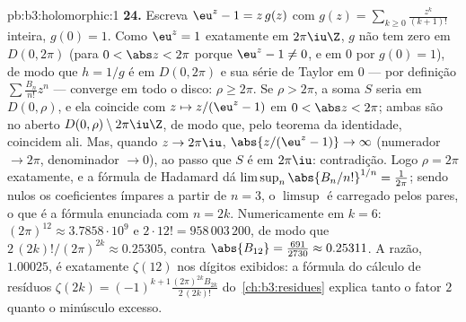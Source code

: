 \begin{solution}{pb:b3:holomorphic:1}
\textbf{24.} Escreva $\eu^z - 1 = z\,g(z)$ com $g(z) =
\sum_{k\geq0}\frac{z^k}{(k+1)!}$ inteira, $g(0) = 1$. Como
$\eu^z = 1$ exatamente em $2\pi\iu\Z$, $g$ não tem zero em
$D(0, 2\pi)$ (para $0 < \abs z < 2\pi$ porque $\eu^z - 1
\neq 0$, e em $0$ por $g(0) = 1$), de modo que $h = 1/g$ é 
em $D(0,2\pi)$ e sua série de Taylor em $0$ --- por
definição $\sum\frac{B_n}{n!}z^n$ --- converge em
todo o disco: $\rho \geq 2\pi$. Se $\rho > 2\pi$, a soma $S$
seria  em $D(0,\rho)$, e ela coincide com $z
\mapsto z/(\eu^z - 1)$ em $0 < \abs z < 2\pi$; ambas são
 no aberto  $D(0,\rho) \setminus
2\pi\iu\Z$, de modo que, pelo teorema da identidade, coincidem ali. Mas,
quando $z \to 2\pi\iu$, $\abs{z/(\eu^z - 1)} \to \infty$
(numerador $\to 2\pi$, denominador $\to 0$), ao passo que $S$ é
 em $2\pi\iu$: contradição. Logo $\rho = 2\pi$
exatamente, e a fórmula de Hadamard dá
$\limsup_n\abs{B_n/n!}^{1/n} = \frac1{2\pi}$; sendo nulos os
coeficientes ímpares a partir de $n = 3$, o $\limsup$ é
carregado pelos  pares, o que é a fórmula enunciada
com $n = 2k$. Numericamente em $k = 6$: $(2\pi)^{12} \approx
3.7858\cdot10^9$ e $2\cdot12! = 958\,003\,200$, de modo que
$2\,(2k)!/(2\pi)^{2k} \approx 0.25305$, contra
$\abs{B_{12}} = \frac{691}{2730} \approx 0.25311$. A
razão, $1.00025$, é exatamente $\zeta(12)$ nos dígitos
exibidos: a fórmula do cálculo de resíduos $\zeta(2k) =
(-1)^{k+1}\frac{(2\pi)^{2k}B_{2k}}{2\,(2k)!}$ do~\cref{ch:b3:residues} explica tanto o fator $2$ quanto o
minúsculo excesso.


\end{solution}
